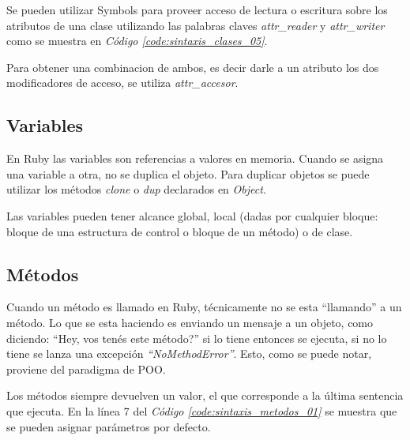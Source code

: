 \documentclass{article}
\newcommand{\refcode}[1]{\textit{Código \ref{#1}}}
\begin{document}
 
\bigskip

 
\bigskip

Se pueden utilizar Symbols para proveer acceso de lectura o escritura sobre los atributos de una clase utilizando las palabras claves \textit{attr\_reader} y \textit{attr\_writer} como se muestra en \refcode{code:sintaxis_clases_05}.   

 
\bigskip

Para obtener una combinacion de ambos, es decir darle a un atributo los dos modificadores de acceso, se utiliza \textit{attr\_accesor}.
\bigskip



\subsection{Variables}
	
	En Ruby las variables son referencias a valores en memoria. Cuando se asigna una variable a otra, no se duplica el objeto. Para duplicar objetos se puede utilizar los métodos \textit{clone} o \textit{dup} declarados en \textit{Object}.
	\par
	Las variables pueden tener alcance global, local (dadas por cualquier bloque: bloque de una estructura de control o bloque de un método) o de clase.

 
\bigskip



\subsection{Métodos}

	Cuando un método es llamado en Ruby, técnicamente no se esta “llamando” a un método. Lo que se esta haciendo es enviando un mensaje a un objeto, como diciendo: “Hey, vos tenés este método?” si lo tiene entonces se ejecuta, si no lo tiene se lanza una excepción \textit{“NoMethodError”}. Esto, como se puede notar, proviene del paradigma de POO.
	\par
	Los métodos siempre devuelven un valor, el que corresponde a la última sentencia que ejecuta. En la línea 7 del \refcode{code:sintaxis_metodos_01} se muestra que se pueden asignar parámetros por defecto.
\end{document}
